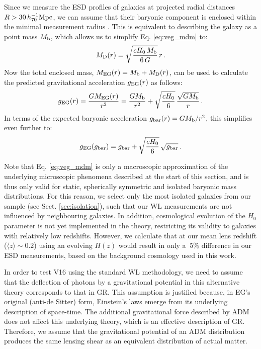 \documentclass[usenatbib]{mnras}
\newcommand{\hsMpc}{\, h_{70}^{-1}{\rm{Mpc}} }
\newcommand{\un}[1]{_{\rm #1}}
\begin{document}
Since we measure the ESD profiles of galaxies at projected radial distances $R>30 \hsMpc$, we can assume that their baryonic component is enclosed within the minimal measurement radius \cite[see also][]{brouwer2017}. This is equivalent to describing the galaxy as a point mass $M\un{b}$, which allows us to simplify Eq. \ref{eq:veg_mdm} to:
\begin{equation}
M_{\rm D}(r)=\sqrt{\frac{cH_{0} \, M_{\rm b}}{6 \, G}} \, r \, .
\end{equation}
Now the total enclosed mass, $M\un{EG}(r) = M\un{b} + M\un{D}(r)$, can be used to calculate the predicted gravitational acceleration $g\un{EG}(r)$ as follows:
\begin{equation}
	g_{\rm EG}(r) = \frac{G M\un{EG}(r)}{r^2} = \frac{G M\un{b}}{r^2} + \sqrt{\frac{cH_{0}}{6}} \, \frac{\sqrt{G M_{\rm b}}}{r} \, .
\end{equation}
In terms of the expected baryonic acceleration $g\un{bar}(r) = G M\un{b}/r^2$, this simplifies even further to:
\begin{equation}
g_{\rm EG}(g\un{bar}) = g\un{bar} + \sqrt{\frac{cH_{0}}{6}} \, \sqrt{g\un{bar}} \, .
\end{equation}

Note that Eq. \ref{eq:veg_mdm} is only a macroscopic approximation of the underlying microscopic phenomena described at the start of this section, and is thus only valid for static, spherically symmetric and isolated baryonic mass distributions. For this reason, we select only the most isolated galaxies from our sample (see Sect. \ref{sec:isolation}), such that our WL measurements are not influenced by neighbouring galaxies. In addition, cosmological evolution of the $H_0$ parameter is not yet implemented in the theory, restricting its validity to galaxies with relatively low redshifts. However, we calculate that at our mean lens redshift ($\langle z \rangle \sim 0.2$) using an evolving $H(z)$ would result in only a $~5\%$ difference in our ESD measurements, based on the background cosmology used in this work.

In order to test V16 using the standard WL methodology, we need to assume that the deflection of photons by a gravitational potential in this alternative theory corresponds to that in GR. This assumption is justified because, in EG's original (anti-de Sitter) form, Einstein's laws emerge from its underlying description of space-time. The additional gravitational force described by ADM does not affect this underlying theory, which is an effective description of GR. Therefore, we assume that the gravitational potential of an ADM distribution produces the same lensing shear as an equivalent distribution of actual matter.
\end{document}
